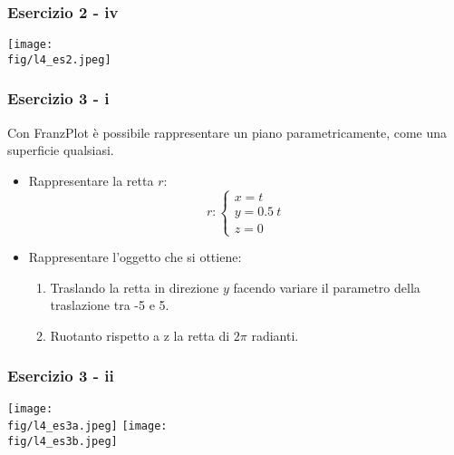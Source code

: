 \documentclass{beamer}
\newcommand{\fig}{./figures} %
\newcommand{\frnzplt}{FranzPlot }
\begin{document}
\begin{frame}
\frametitle{Esercizio 2 - iv}
\begin{center}
\texttt{[image: \\fig/l4\_es2.jpeg]}
\end{center}
\end{frame}
%
\begin{frame}
\frametitle{Esercizio 3 - i}
Con \frnzplt \`e possibile rappresentare un piano parametricamente, come una superficie qualsiasi.
\begin{itemize}
\item Rappresentare la retta $r$:
\begin{displaymath}
r:\begin{cases}
x = t \\
y = 0.5~t\\
z = 0
\end{cases}
\end{displaymath}
\item Rappresentare l'oggetto che si ottiene: 
\begin{enumerate}
\item Traslando la retta in direzione $y$ facendo variare il parametro della traslazione tra -5 e 5.
\item Ruotanto rispetto a z la retta di $2\pi$ radianti.
\end{enumerate}
\end{itemize}
\end{frame}
\begin{frame}
\frametitle{Esercizio 3 - ii}
\begin{center}
\texttt{[image: \\fig/l4\_es3a.jpeg]}
\texttt{[image: \\fig/l4\_es3b.jpeg]}
\end{center}
\end{frame}
\end{document}
